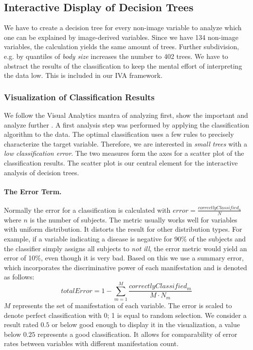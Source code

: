 \documentclass[a4paper,twoside]{style/article}
\begin{document}
\subsection{Interactive Display of Decision Trees}
We have to create a decision tree for every non-image variable to analyze which one can be explained by image-derived variables.
Since we have 134 non-image variables, the calculation yields the same amount of trees.
Further subdivision, e.g. by quantiles of \emph{body size} increases the number to 402 trees.
We have to abstract the results of the classification to keep the mental effort of interpreting the data low.
This is included in our IVA framework.
\subsubsection{Visualization of Classification Results}
\label{subsec:VisualizationOfClassificationResults}
We follow the Visual Analytics mantra of analyzing first, show the important and analyze further \cite{Keim}.
A first analysis step was performed by applying the classification algorithm to the data.
The optimal classification uses a few rules to precisely characterize the target variable.
Therefore, we are interested in \emph{small trees} with a \emph{low classification error}.
The two measures form the axes for a scatter plot of the classification results.
The scatter plot is our central element for the interactive analysis of decision trees.

\paragraph{The Error Term. }
Normally the error for a classification is calculated with $error = \frac{correctlyClassified_{n}} {N}$ where $n$ is the number of subjects.
The metric usually works well for variables with uniform distribution.
It distorts the result for other distribution types.
For example, if a variable indicating a disease is negative for 90\% of the subjects and the classifier simply assigns all subjects to \emph{not ill}, the error metric would yield an error of 10\%, even though it is very bad.
Based on this we use a summary error, which incorporates the discriminative power of each manifestation and is denoted as follows:
\begin{equation}
totalError = 1 - \sum_{m=1}^M \frac{correctlyClassified_{m}}{M\cdot N_m}
\end{equation}
$M$ represents the set of manifestation of each variable.
The error is scaled to denote perfect classification with 0; 1 is equal to random selection.
We consider a result rated $0.5$ or below good enough to display it in the visualization, a value below $0.25$ represents a good classification.
It allows for comparability of error rates between variables with different manifestation count.
\end{document}
